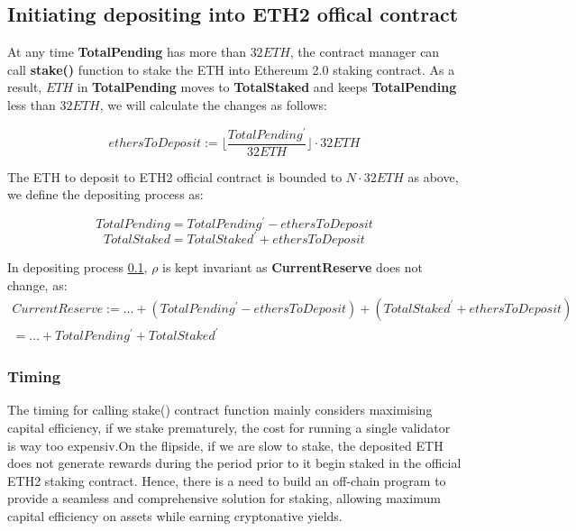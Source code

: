 \documentclass{article}
\begin{document}
\subsection{Initiating depositing into ETH2 offical contract}
\label{depositing}
At any time \textbf{TotalPending} has more than $32 ETH$, the contract manager can call \textbf{stake()} function to stake the ETH into Ethereum 2.0 staking contract. As a result, $ETH$ in \textbf{TotalPending} moves to \textbf{TotalStaked} and keeps \textbf{TotalPending} less than $32 ETH$, we will calculate the changes as follows:

\begin{lemma}
\[ethersToDeposit := \lfloor\frac{TotalPending^{\prime}}{32ETH}\rfloor \cdot 32ETH\]
\end{lemma}

The ETH to deposit to ETH2 official contract is bounded to $N\cdot 32ETH$ as above, we define the depositing process as:

\begin{theorem}
\label{depositing_vars}
\[TotalPending = TotalPending^{\prime} - ethersToDeposit \]
\[TotalStaked = TotalStaked^{\prime} + ethersToDeposit \]
\end{theorem}

In depositing process \ref{depositing}, $\rho$ is kept invariant as \textbf{CurrentReserve} does not change, as:
\begin{multline}
CurrentReserve := \dots + (TotalPending^{\prime} - ethersToDeposit) + (TotalStaked^{\prime} + ethersToDeposit) \\
= \dots + TotalPending^{\prime} + TotalStaked^{\prime} 
\end{multline}

\subsubsection{Timing}
The timing for calling stake() contract function mainly considers maximising capital efficiency, if we stake prematurely, the cost for running a single validator is way too expensiv.On the flipside, if we are slow to stake, the deposited ETH does not generate rewards during the period prior to it begin staked in the official ETH2 staking contract. Hence, there is a need to build an off-chain program to provide a seamless and comprehensive solution for staking, allowing maximum capital efficiency on assets while earning cryptonative yields.
\end{document}
